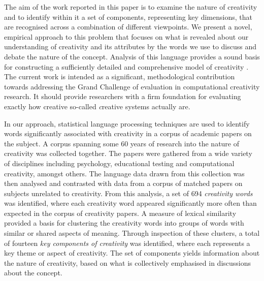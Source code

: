 \documentclass[10pt,letterpaper]{article}
\begin{document}
The aim of the work reported in this paper is to examine the nature of creativity and to identify within it a set of components, representing key dimensions, that are recognised across a combination of different viewpoints. We present a novel, empirical approach to this problem that focuses on what is revealed about our understanding of creativity and its attributes by the words we use to discuss and debate the nature of the concept. Analysis of this language provides a sound basis for constructing a sufficiently detailed and comprehensive model of creativity \cite{lakoff87,wittgenstein58}. The current work is intended as a significant, methodological contribution towards addressing the Grand Challenge of evaluation in computational creativity research. It should provide researchers with a firm foundation for evaluating exactly how creative so-called {\emph creative systems} actually are.

In our approach, statistical language processing techniques are used to identify words significantly associated with creativity in a corpus of academic papers on the subject. A corpus spanning some 60 years of research into the nature of creativity was collected together. The papers were gathered from a wide variety of disciplines including psychology, educational testing and computational creativity, amongst others. The language data drawn from this collection was then analysed and contrasted with data from a corpus of matched papers on subjects unrelated to creativity. From this analysis, a set of 694 {\em creativity words\/} was identified, where each creativity word appeared significantly more often than expected in the corpus of creativity papers. A measure of lexical similarity provided a basis for clustering the creativity words into groups of words with similar or shared aspects of meaning. Through inspection of these clusters, a total of fourteen {\em key components of creativity\/} was identified, where each represents a key theme or aspect of creativity. The set of components yields information about the nature of creativity, based on what is collectively emphasised in discussions about the concept. 

\end{document}
